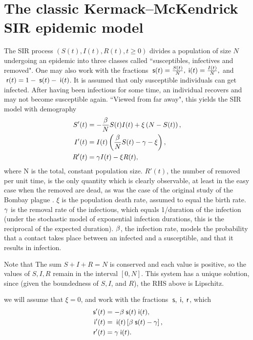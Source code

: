 \section{The classic Kermack–McKendrick SIR epidemic  model }


The SIR process $(S(t),I(t), R(t), t \geq 0)$ divides a population of size $N$ undergoing an epidemic into three classes called ``susceptibles, infectives and  removed". One may also work  with the \corr fractions $\;\mathsf s(t)=\frac{S(t)}N,\;\mathsf i(t)=\frac{I(t)}N, $
and  $\; \mathsf r(t)=1-\;\mathsf s(t)-\;\mathsf i(t)$.
 It is assumed that only susceptible
individuals can get infected.  After having been infectious for
some time, an
individual recovers and may not become susceptible again. ``Viewed from far away", this yields the  SIR model with demography  \cite{kermack1927contribution,Chavez}
\begin{align}
S'(t)&=-\fr{\b}N S (t) I (t)+ \xi \pr{N  - S(t)},\nonumber\\ %
I'(t)&= I(t)\pr{\fr{\b}N  S(t)-\g -\xi},\la{SIR}
\\
R'(t)&= \g  I(t)-\xi R(t),\nonumber %
\end{align}
where
\BEN \im N is the total, constant population size. \im $R'(t)$, the number of removed per unit time, is the only quantity which is clearly observable, at least in the easy case when the removed are dead, as was the case of the original study of the Bombay plague \cite{kermack1927contribution}. \im $\xi$ is the population death rate, assumed to equal the birth rate.
\im $\gamma$ is the  removal rate of the infectious, which equals 1/duration of the infection (under the stochastic model of exponential infection durations, this is the reciprocal of the expected duration).
\im $\beta$, the  infection rate, models the probability  that a contact takes place between an infected and a susceptible, and that it results in  infection.
 \EEN


Note that  \BEN
  \im The sum $S+I+R =N$ is conserved and each value is positive, so the values of $S, I, R$ remain in the interval $[0,N]$.
  \im  This system has a unique  solution, since (given the boundedness of $S, I$, and $R$), the RHS above is Lipschitz.
\EEN



\Fno we will assume that $\xi=0$, and work with the fractions $\;\mathsf s,\;\mathsf i,\; \mathsf r$, which \saty
  \begin{align}
\;\mathsf s'(t)&=  -\beta \;\mathsf s(t)\;\mathsf i(t) ,\nonumber\\
\;\mathsf i'(t)&= \;\mathsf i(t)\left[\beta \;\mathsf s(t)-\gamma\right],\label{sir}
\\
\; \mathsf r'(t)&= \gamma \;\mathsf i(t).\nonumber
\end{align}

